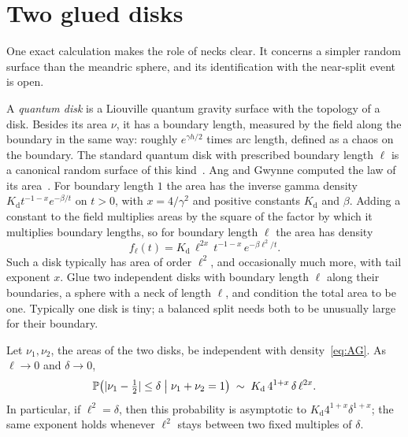 \section{Two glued disks}\label{sec:disks}

One exact calculation makes the role of necks clear. It concerns a simpler random surface than
the meandric sphere, and its identification with the near-split event is open.

A \emph{quantum disk} is a Liouville quantum gravity surface with the topology of a disk. Besides
its area $\nu$, it has a boundary length, measured by the field along the boundary in the same way:
roughly $e^{\gamma h/2}$ times arc length, defined as a chaos on the boundary. The standard quantum
disk with prescribed boundary length $\ell$ is a canonical random surface of this kind~\cite{DMS}.
Ang and Gwynne computed the law of its area~\cite[Theorem~1.2]{AG}. For boundary length $1$ the area
has the inverse gamma density $K_{\mathrm d}t^{-1-x}e^{-\beta/t}$ on $t>0$, with $x=4/\gamma^2$ and
positive constants $K_{\mathrm d}$ and $\beta$. Adding a constant to the field multiplies areas by the square of the
factor by which it multiplies boundary lengths, so for boundary length $\ell$ the area has density
\begin{equation}\label{eq:AG}
f_\ell(t)=K_{\mathrm d}\,\ell^{2x}\,t^{-1-x}\,e^{-\beta\ell^2/t}.
\end{equation}
Such a disk typically has area of order $\ell^2$, and occasionally much more, with tail exponent
$x$. Glue two independent disks with boundary length $\ell$ along their boundaries, a sphere with a
neck of length $\ell$, and condition the total area to be one. Typically one disk is tiny; a
balanced split needs both to be unusually large for their boundary.

\begin{proposition}\label{prop:disks}
Let $\nu_1,\nu_2$, the areas of the two disks, be independent with density~\eqref{eq:AG}. As $\ell\to0$ and $\delta\to0$,
\[
\mathbb{P}\bigl(|\nu_1-\tfrac12|\le\delta\;\big|\;\nu_1+\nu_2=1\bigr)\;\sim\;K_{\mathrm d}\,4^{1+x}\,\delta\,\ell^{2x}.
\]
In particular, if $\ell^2=\delta$, then this probability is asymptotic to $K_{\mathrm d}4^{1+x}\delta^{1+x}$; the same
exponent holds whenever $\ell^2$ stays between two fixed multiples of $\delta$.
\end{proposition}

